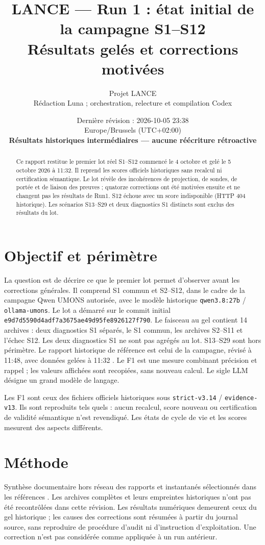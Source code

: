 \documentclass[11pt,a4paper]{article}
\title{LANCE — Run 1 : état initial de la campagne S1–S12\\\large Résultats gelés et corrections motivées}
\author{Projet LANCE\\\small Rédaction Luna ; orchestration, relecture et compilation Codex}
\date{Dernière révision : 2026-10-05 23:38\\Europe/Brussels (UTC+02:00)\\\textbf{Résultats historiques intermédiaires — aucune réécriture rétroactive}}
\newcommand{\code}[1]{{\urlstyle{tt}\nolinkurl{#1}}}
\begin{document}
\maketitle
\begin{abstract}
Ce rapport restitue le premier lot réel S1–S12 commencé le 4 octobre et gelé le 5 octobre 2026 à 11:32. Il reprend les scores officiels historiques sans recalcul ni certification sémantique. Le lot révèle des incohérences de projection, de sondes, de portée et de liaison des preuves ; quatorze corrections ont été motivées ensuite et ne changent pas les résultats de Run1. S12 échoue avec un score indisponible (HTTP 404 historique). Les scénarios S13–S29 et deux diagnostics S1 distincts sont exclus des résultats du lot.
\end{abstract}
\tableofcontents
\section{Objectif et périmètre}
La question est de décrire ce que le premier lot permet d'observer avant les corrections générales. Il comprend S1 commun et S2–S12, dans le cadre de la campagne Qwen UMONS autorisée, avec le modèle historique \code{qwen3.8:27b} / \code{ollama-umons}. Le lot a démarré sur le commit initial \code{e9d7d5590d4adf7a3675ae49d95fe8926127f790}. Le faisceau au gel contient 14 archives : deux diagnostics S1 séparés, le S1 commun, les archives S2–S11 et l'échec S12. Les deux diagnostics S1 ne sont pas agrégés au lot. S13–S29 sont hors périmètre. Le rapport historique de référence est celui de la campagne, révisé à 11:48, avec données gelées à 11:32 \cite{base}. Le F1 est une mesure combinant précision et rappel ; les valeurs affichées sont recopiées, sans nouveau calcul. Le sigle LLM désigne un grand modèle de langage.

Les F1 sont ceux des fichiers officiels historiques sous \code{strict-v3.14} / \code{evidence-v13}. Ils sont reproduits tels quels : aucun recalcul, score nouveau ou certification de validité sémantique n'est revendiqué. Les états de cycle de vie et les scores mesurent des aspects différents.
\section{Méthode}
Synthèse documentaire hors réseau des rapports et instantanés sélectionnés dans les références \cite{base,bundle,corrections}. Les archives complètes et leurs empreintes historiques n'ont pas été recontrôlées dans cette révision. Les résultats numériques demeurent ceux du gel historique ; les causes des corrections sont résumées à partir du journal source, sans reproduire de procédure d'audit ni d'instruction d'exploitation. Une correction n'est pas considérée comme appliquée à un run antérieur.
\end{document}
